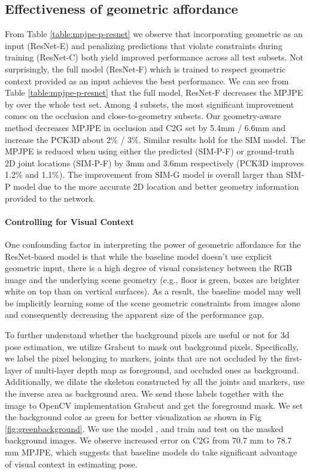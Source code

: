 \documentclass[times,referee,twocolumn,final,authoryear]{elsarticle}
\begin{document}
\subsection{Effectiveness of geometric affordance}

From Table \ref{table:mpjpe-p-resnet} we observe that incorporating geometric
as an input (ResNet-E) and penalizing predictions that violate constraints
during training (ResNet-C) both yield improved performance across all test
subsets. Not surprisingly, the full model (ResNet-F) which is trained to 
respect geometric context provided as an input achieves the best performance.
We can see from Table \ref{table:mpjpe-p-resnet} that the full model, ResNet-F decreases
the MPJPE by  over the whole test set. Among 4 subsets, the most
significant improvement comes on the occlusion and close-to-geometry subsets. Our
geometry-aware method decreases MPJPE in occlusion and C2G set by
5.4mm / 6.6mm and increase the PCK3D about 2\% / 3\%.  
Similar results hold for the SIM model.  The MPJPE is reduced when using either
the predicted (SIM-P-F) or ground-truth 2D joint locations (SIM-P-F) by 3mm
and 3.6mm respectively  (PCK3D improves 1.2\% and 1.1\%).  The improvement from 
SIM-G model is overall larger than SIM-P model due to the more accurate 2D 
location and better geometry information provided to the network. 


\paragraph{Controlling for Visual Context} 
 One confounding factor in interpreting the power of geometric affordance for
 the ResNet-based model is 
 that while the baseline model doesn't use explicit geometric input, there is 
 a high degree of visual consistency between the RGB image and the underlying 
 scene geometry (e.g., floor is green, boxes are brighter white on top than 
 on vertical surfaces). As a result, the baseline model may well be implicitly
 learning some of the scene geometric constraints from images alone and 
 consequently decreasing the apparent size of the performance gap.
 
  To further understand whether the background pixels are useful or not for 3d pose estimation, we utilize Grabcut \cite{grabcut} to mask out background pixels. Specifically, we label the pixel belonging to markers, joints that are not occluded by the first-layer of multi-layer depth map as foreground, and occluded ones as background. Additionally, we dilate the skeleton constructed by all the joints and markers, use the inverse area as background area. We send these labels together with the image to OpenCV implementation Grabcut and get the foreground mask. We set the background color as green for better visualization as shown in Fig \ref{fig:greenbackground}. We use the model \cite{rootnet}, and train and test on the masked background images. We observe increased error on C2G from 70.7 mm to 78.7 mm MPJPE, which suggests that baseline models do take significant advantage of visual context in estimating pose. 
 
\end{document}
